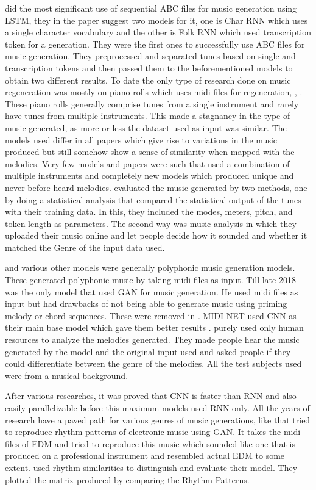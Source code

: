 \documentclass[oneside,12pt]{Classes/RoboticsLaTeX}
\begin{document}
\cite{abcmusic} did the most significant use of sequential ABC files for music generation using LSTM, they in the paper suggest two models for it, one is Char RNN which uses a single character vocabulary and the other is Folk RNN which used transcription token for a generation. They were the first ones to successfully use ABC files for music generation. They preprocessed and separated tunes based on single and transcription tokens and then passed them to the beforementioned models to obtain two different results. To date the only type of research done on music regeneration was mostly on piano rolls which uses midi files for regeneration, \cite{midinet}, \cite{musegan}. These piano rolls generally comprise tunes from a single instrument and rarely have tunes from multiple instruments. This made a stagnancy in the type of music generated, as more or less the dataset used as input was similar. The models used differ in all papers which give rise to variations in the music produced but still somehow show a sense of similarity when mapped with the melodies. Very few models and papers were such that used a combination of multiple instruments and completely new models which produced unique and never before heard melodies. \cite{abcmusic} evaluated the music generated by two methods, one by doing a statistical analysis that compared the statistical output of the tunes with their training data. In this, they included the modes, meters, pitch, and token length as parameters. The second way was music analysis in which they uploaded their music online and let people decide how it sounded and whether it matched the Genre of the input data used.

\cite{polygan} and various other models were generally polyphonic music generation models. These generated polyphonic music by taking midi files as input. Till late 2018 \cite{crnngan} was the only model that used GAN for music generation. He used midi files as input but had drawbacks of not being able to generate music using priming melody or chord sequences. These were removed in \cite{midinet}. MIDI NET used CNN as their main base model which gave them better results \cite{midinet}. \cite{midinet} purely used only human resources to analyze the melodies generated. They made people hear the music generated by the model and the original input used and asked people if they could differentiate between the genre of the melodies. All the test subjects used were from a musical background.

After various researches, it was proved that CNN is faster than RNN and also easily parallelizable \cite{pxlcnn} before this maximum models used RNN only. All the years of research have a paved path for various genres of music generations, like \cite{edm} that tried to reproduce rhythm patterns of electronic music using GAN. It takes the midi files of EDM and tried to reproduce this music which sounded like one that is produced on a professional instrument and resembled actual EDM to some extent. \cite{edm} used rhythm similarities to distinguish and evaluate their model. They plotted the matrix produced by comparing the Rhythm Patterns. 
\end{document}

